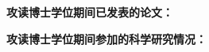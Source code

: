 \begin{publications}{99}
\item[] {\songti{}\bf{攻读博士学位期间已发表的论文：}}
\item 
\item 



\vspace{1.0cm}
\item[] {\songti{}\bf{攻读博士学位期间参加的科学研究情况：}}
\setcounter{enumiv}{0}
\item 
\item 

\end{publications}
